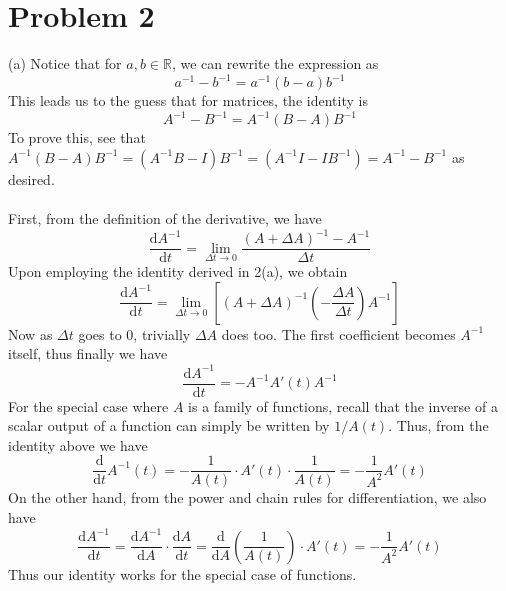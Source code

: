 \documentclass{article}
\begin{document}
\section*{Problem 2}
(a) Notice that for $a, b \in \mathbb{R}$, we can rewrite the expression as
\begin{equation*}
    a^{-1} - b^{-1} = a^{-1}(b-a)b^{-1}
\end{equation*}
This leads us to the guess that for matrices, the identity is
\begin{equation*}
    A^{-1} - B^{-1} = A^{-1}(B-A)B^{-1}
\end{equation*}
To prove this, see that $A^{-1}(B-A)B^{-1} = (A^{-1}B - I)B^{-1} = (A^{-1}I - IB^{-1}) = A^{-1} - B^{-1}$ as desired. \\\\
 First, from the definition of the derivative, we have
\begin{equation*}
    \frac{\text{d}A^{-1}}{\text{d}t} = \lim_{\Delta t \to 0} \frac{(A+ \Delta A)^{-1} - A^{-1}}{\Delta t}
\end{equation*}
Upon employing the identity derived in 2(a), we obtain
\begin{equation*}
    \frac{\text{d}A^{-1}}{\text{d}t} = \lim_{\Delta t \to 0} \left[(A + \Delta A)^{-1} \left(-\frac{\Delta A}{\Delta t}\right)A^{-1}\right] 
\end{equation*}
Now as $\Delta t$ goes to $0$, trivially $\Delta A$ does too. The first coefficient becomes $A^{-1}$ itself, thus finally we have
\begin{equation*}
    \frac{\text{d} A^{-1}}{\text{d}t} = -A^{-1}A'(t)A^{-1}
\end{equation*}
For the special case where $A$ is a family of functions, recall that the inverse of a scalar output of a function can simply be written by $1/A(t)$. Thus, from the identity above we have
\begin{equation*}
    \frac{\text{d}}{\text{d}t}A^{-1}(t) = - \frac{1}{A(t)}\cdot A'(t) \cdot \frac{1}{A(t)} = -\frac{1}{A^{2}}A'(t)
\end{equation*}
On the other hand, from the power and chain rules for differentiation, we also have
\begin{equation*}
    \frac{\text{d}A^{-1}}{\text{d}t} = \frac{\text{d}A^{-1}}{\text{d}A}\cdot \frac{\text{d}A}{\text{d}t} = \frac{\text{d}}{\text{d}A}\left(\frac{1}{A(t)}\right)\cdot A'(t) = - \frac{1}{A^{2}}A'(t)
\end{equation*}
Thus our identity works for the special case of functions. \\\\
\end{document}
